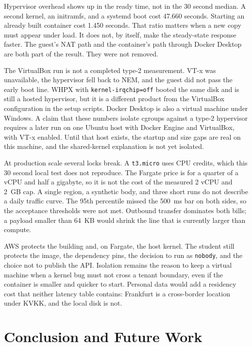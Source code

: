 \documentclass[conference,a4paper]{IEEEtran}
\begin{document}
Hypervisor overhead shows up in the ready time, not in the 30 second median. A second kernel, an initramfs, and a systemd boot cost 47.660 seconds. Starting an already built container cost 1.450 seconds. That ratio matters when a new copy must appear under load. It does not, by itself, make the steady-state response faster. The guest's NAT path and the container's path through Docker Desktop are both part of the result. They were not removed.

The VirtualBox run is not a completed type-2 measurement. VT-x was unavailable, the hypervisor fell back to NEM, and the guest did not pass the early boot line. WHPX with \texttt{kernel-irqchip=off} booted the same disk and is still a hosted hypervisor, but it is a different product from the VirtualBox configuration in the setup scripts. Docker Desktop is also a virtual machine under Windows. A claim that these numbers isolate cgroups against a type-2 hypervisor requires a later run on one Ubuntu host with Docker Engine and VirtualBox, with VT-x enabled. Until that host exists, the startup and size gaps are real on this machine, and the shared-kernel explanation is not yet isolated.

At production scale several locks break. A \texttt{t3.micro} uses CPU credits, which this 30 second local test does not reproduce. The Fargate price is for a quarter of a vCPU and half a gigabyte, so it is not the cost of the measured 2 vCPU and 2~GB cap. A single region, a synthetic body, and three short runs do not describe a daily traffic curve. The 95th percentile missed the 500~ms bar on both sides, so the acceptance thresholds were not met. Outbound transfer dominates both bills; a payload smaller than 64~KB would shrink the line that is currently larger than compute.

AWS protects the building and, on Fargate, the host kernel. The student still protects the image, the dependency pins, the decision to run as \texttt{nobody}, and the choice not to publish the API. Isolation remains the reason to keep a virtual machine when a kernel bug must not cross a tenant boundary, even if the container is smaller and quicker to start. Personal data would add a residency cost that neither latency table contains: Frankfurt is a cross-border location under KVKK, and the local disk is not.

\section{Conclusion and Future Work}
\label{sec:conclusion}
\end{document}
